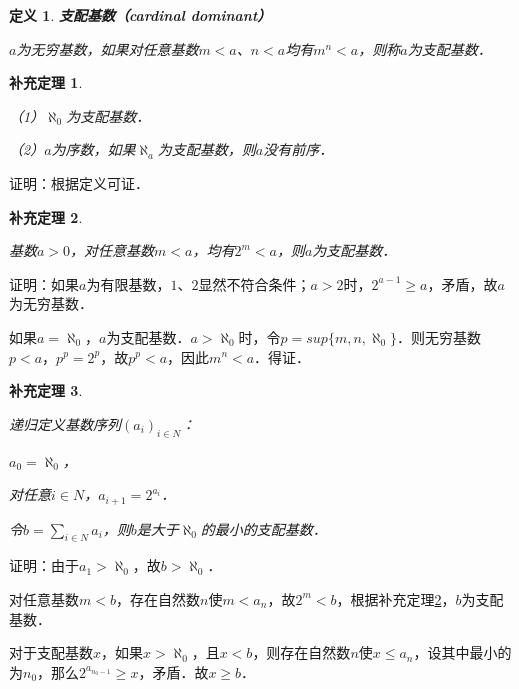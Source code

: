 \documentclass[12pt, a4paper, oneside]{book}
\newtheorem{cor}{补充定理}
\newtheorem{de}{定义}
\begin{document}
			\begin{de}
				\textbf{支配基数（cardinal dominant）}
				\par
				$a$为无穷基数，如果对任意基数$m<a$、$n<a$均有$m^n<a$，则称$a$为支配基数．
			\end{de}
			
			\begin{cor}\label{cor395}
				\hfill\par
				（1）$\aleph_0$为支配基数．
				\par
				（2）$a$为序数，如果$\aleph_a$为支配基数，则$a$没有前序．
			\end{cor}
			证明：根据定义可证．
			
			\begin{cor}\label{cor396}
				\hfill\par
				基数$a>0$，对任意基数$m<a$，均有$2^m<a$，则$a$为支配基数．
			\end{cor}
			证明：如果$a$为有限基数，$1$、$2$显然不符合条件；$a>2$时，$2^{a-1}\geq a$，矛盾，故$a$为无穷基数．
			\par
			如果$a=\aleph_0$，$a$为支配基数．$a>\aleph_0$时，令$p=sup\{m, n, \aleph_0\}$．则无穷基数$p<a$，$p^p=2^p$，故$p^p<a$，因此$m^n<a$．得证．
			
			\begin{cor}\label{cor397}
				\hfill\par
				递归定义基数序列$(a_i)_{i\in N}$：
				\par
				$a_0=\aleph_0$，
				\par
				对任意$i\in N$，$a_{i+1}=2^{a_i}$．
				\par
				令$b=\sum\limits_{i\in N}a_i$，则$b$是大于$\aleph_0$的最小的支配基数．
			\end{cor}
			证明：由于$a_1>\aleph_0$，故$b>\aleph_0$．
			\par
			对任意基数$m<b$，存在自然数$n$使$m<a_n$，故$2^m<b$，根据补充定理\ref{cor396}，$b$为支配基数．
			\par
			对于支配基数$x$，如果$x>\aleph_0$，且$x<b$，则存在自然数$n$使$x\leq a_n$，设其中最小的为$n_0$，那么$2^{a_{n_0-1}}\geq x$，矛盾．故$x\geq b$．
			
\end{document}
